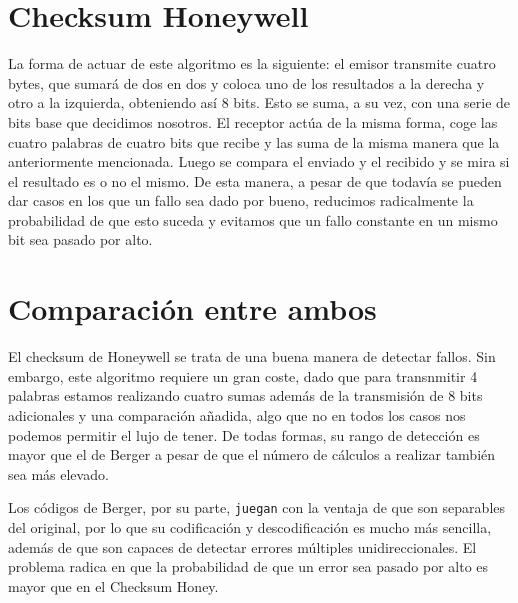 \documentclass[a4paper]{article}
\begin{document}
\section{Checksum Honeywell}

	La forma de actuar de este algoritmo es la siguiente: el emisor transmite cuatro bytes, que sumará de dos en dos y coloca uno de los resultados a la derecha y otro a la izquierda, obteniendo así 8 bits. Esto se suma, a su vez, con una serie de bits base que decidimos nosotros.
	El receptor actúa de la misma forma, coge las cuatro palabras de cuatro bits que recibe y las suma de la misma manera que la anteriormente mencionada. Luego se compara el enviado y el recibido y se mira si el resultado es o no el mismo. De esta manera, a pesar de que todavía se pueden dar casos en los que un fallo sea dado por bueno, reducimos radicalmente la probabilidad de que esto suceda y evitamos que un fallo constante en un mismo bit sea pasado por alto.
	
\section{Comparación entre ambos}

El checksum de Honeywell se trata de una buena manera de detectar fallos. Sin embargo, este algoritmo requiere un gran coste, dado que para transnmitir 4 palabras estamos realizando cuatro sumas además de la transmisión de 8 bits adicionales y una comparación añadida, algo que no en todos los casos nos podemos permitir el lujo de tener.
	De todas formas, su rango de detección es mayor que el de Berger a pesar de que el número de cálculos a realizar también sea más elevado.

Los códigos de Berger, por su parte, \texttt{juegan} con la ventaja de que son separables del original, por lo que su codificación y descodificación es mucho más sencilla, además de que son capaces de detectar errores múltiples unidireccionales. El problema radica en que la probabilidad de que un error sea pasado por alto es mayor que en el Checksum Honey.
	
\end{document}
